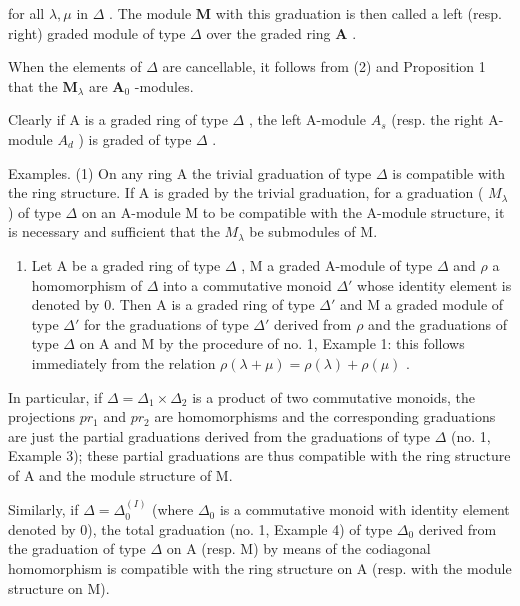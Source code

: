 for all \(\lambda, \mu\) in \(\Delta\) . The module \(\mathbf{M}\) with this graduation is then called a left (resp. right) graded module of type \(\Delta\) over the graded ring \(\mathbf{A}\) .

When the elements of \(\Delta\) are cancellable, it follows from (2) and Proposition 1 that the \(\mathbf{M}_{\lambda}\) are \(\mathbf{A}_0\) -modules.

Clearly if A is a graded ring of type \(\Delta\) , the left A-module \(A_{s}\) (resp. the right A-module \(A_{d}\) ) is graded of type \(\Delta\) .

Examples. (1) On any ring A the trivial graduation of type \(\Delta\) is compatible with the ring structure. If A is graded by the trivial graduation, for a graduation ( \(M_{\lambda}\) ) of type \(\Delta\) on an A-module M to be compatible with the A-module structure, it is necessary and sufficient that the \(M_{\lambda}\) be submodules of M.

\begin{enumerate}
\def\labelenumi{(\arabic{enumi})}
\setcounter{enumi}{1}
\tightlist
\item
  Let A be a graded ring of type \(\Delta\) , M a graded A-module of type \(\Delta\) and \(\rho\) a homomorphism of \(\Delta\) into a commutative monoid \(\Delta'\) whose identity element is denoted by 0. Then A is a graded ring of type \(\Delta'\) and M a graded module of type \(\Delta'\) for the graduations of type \(\Delta'\) derived from \(\rho\) and the graduations of type \(\Delta\) on A and M by the procedure of no. 1, Example 1: this follows immediately from the relation \(\rho(\lambda + \mu) = \rho(\lambda) + \rho(\mu)\) .
\end{enumerate}

In particular, if \(\Delta = \Delta_{1} \times \Delta_{2}\) is a product of two commutative monoids, the projections \(pr_{1}\) and \(pr_{2}\) are homomorphisms and the corresponding graduations are just the partial graduations derived from the graduations of type \(\Delta\) (no. 1, Example 3); these partial graduations are thus compatible with the ring structure of A and the module structure of M.

Similarly, if \(\Delta = \Delta_0^{(I)}\) (where \(\Delta_0\) is a commutative monoid with identity element denoted by 0), the total graduation (no. 1, Example 4) of type \(\Delta_0\) derived from the graduation of type \(\Delta\) on A (resp. M) by means of the codiagonal homomorphism is compatible with the ring structure on A (resp. with the module structure on M).

